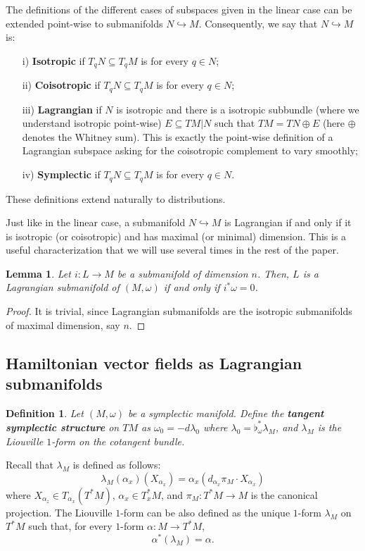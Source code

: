 \documentclass[12pt]{article}
\newtheorem{Def}{Definition}[section]
\newtheorem{lemma}{Lemma}[section]
\begin{document}
The definitions of the different cases of subspaces given in the linear case can be extended point-wise to submanifolds $N \hookrightarrow M$. Consequently, we say that $N \hookrightarrow M$ is: 
\begin{itemize}
 \item[i)] \textbf{Isotropic} if $T_qN \subseteq T_qM$ is for every $q \in N$;
\item[ii)] \textbf{Coisotropic} if $T_qN \subseteq T_qM $ is for every $q \in N$;
\item[iii)] \textbf{Lagrangian} if $N$ is isotropic and there is a isotropic subbundle (where we understand isotropic point-wise) $E \subseteq TM | N$ such that $TM = TN \oplus E$ (here $\oplus$ denotes the Whitney sum). This is exactly the point-wise definition of a Lagrangian subspace asking for the coisotropic complement to vary smoothly;
\item[iv)] \textbf{Symplectic} if $T_qN \subseteq T_qM$ is for every $q \in N$.
\end{itemize}
These definitions extend naturally to distributions.

Just like in the linear case, a submanifold $N \hookrightarrow M$ is Lagrangian if and only if it is isotropic (or coisotropic) and has maximal (or minimal) dimension. This is a useful characterization that we will use several times in the rest of the paper.\\

\begin{lemma}\label{CharacterizationLagrangianSympelctic} Let $i: L \rightarrow M$ be a submanifold of dimension $n$. Then, $L$ is a Lagrangian submanifold of $(M, \omega)$ if and only if $i^*\omega = 0$.
\end{lemma}
\begin{proof} It is trivial, since Lagrangian submanifolds are the isotropic submanifolds of maximal dimension, say $n$.
\end{proof}


\subsection{Hamiltonian vector fields as Lagrangian submanifolds}
\begin{Def}Let $(M , \omega)$ be a symplectic manifold. Define the \textbf{tangent symplectic structure} on $TM$ as $\omega_0 = -d\lambda_0$ where $\lambda_0= \flat_\omega^*\lambda_M$, and $\lambda_M$ is the Liouville $1$-form on the cotangent bundle.
\end{Def}
Recall that $\lambda_M$ is defined as follows:
$$
\lambda_M(\alpha_x)(X_{\alpha_x}) = \alpha_x(d_{\alpha_x}\pi_M \cdot X_{\alpha_x})
$$
where $X_{\alpha_z} \in T_{\alpha_x}(T^*M)$, $\alpha_x \in T^*_xM$, and $\pi_M : T^*M \longrightarrow M$ is the canonical projection. The Liouville $1$-form can be also defined as the unique $1$-form $\lambda_M$ on $T^*M$ such that, for every $1$-form $\alpha:M \rightarrow T^*M$, $$\alpha^*(\lambda_M) = \alpha.$$
\end{document}
